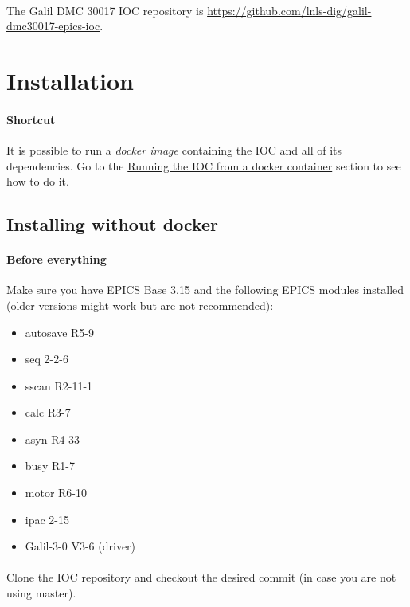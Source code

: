 \documentclass[openany]{article}
\begin{document}
\paragraph{} The Galil DMC 30017 IOC repository is \url{https://github.com/lnls-dig/galil-dmc30017-epics-ioc}.

\section{Installation}

    \paragraph{Shortcut} It is possible to run a \emph{docker image} containing the IOC and all of its dependencies. Go to the \hyperref[sec:run-with-docker]{Running the IOC from a docker container} section to see how to do it.

    \subsection{Installing without docker}

        \paragraph{Before everything} Make sure you have EPICS Base 3.15 and the following EPICS modules installed (older versions might work but are not recommended):

        \begin{itemize}
          \item autosave R5-9
          \item seq 2-2-6
          \item sscan R2-11-1
          \item calc R3-7
          \item asyn R4-33
          \item busy R1-7
          \item motor R6-10
          \item ipac 2-15
          \item Galil-3-0 V3-6 (driver)
        \end{itemize} 

        \paragraph{} Clone the IOC repository and checkout the desired commit (in case you are not using master).
\end{document}
